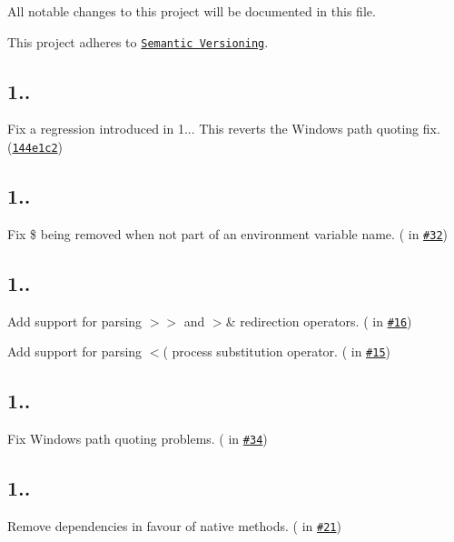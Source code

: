 All notable changes to this project will be documented in this file.

This project adheres to \href{http://semver.org/}{\tt Semantic Versioning}.

\subsection*{1..}


\begin{DoxyItemize}
\item Fix a regression introduced in 1... This reverts the Windows path quoting fix. (\href{https://github.com/substack/node-shell-quote/commit/144e1c20cd57549a414c827fb3032e60b7b8721c}{\tt 144e1c2})
\end{DoxyItemize}

\subsection*{1..}


\begin{DoxyItemize}
\item Fix {\ttfamily \$} being removed when not part of an environment variable name. (\href{https://github.com/Admin}{\tt } in \href{https://github.com/substack/node-shell-quote/pull/32}{\tt \#32})
\end{DoxyItemize}

\subsection*{1..}


\begin{DoxyItemize}
\item Add support for parsing {\ttfamily $>$$>$} and {\ttfamily $>$\&} redirection operators. (\href{https://github.com/forivall}{\tt } in \href{https://github.com/substack/node-shell-quote/pull/16}{\tt \#16})
\item Add support for parsing {\ttfamily $<$(} process substitution operator. (\href{https://github.com/cuonglm}{\tt } in \href{https://github.com/substack/node-shell-quote/pull/15}{\tt \#15})
\end{DoxyItemize}

\subsection*{1..}


\begin{DoxyItemize}
\item Fix Windows path quoting problems. (\href{https://github.com/dy}{\tt } in \href{https://github.com/substack/node-shell-quote/pull/34}{\tt \#34})
\end{DoxyItemize}

\subsection*{1..}


\begin{DoxyItemize}
\item Remove dependencies in favour of native methods. (\href{https://github.com/zertosh}{\tt } in \href{https://github.com/substack/node-shell-quote/pull/21}{\tt \#21}) 
\end{DoxyItemize}